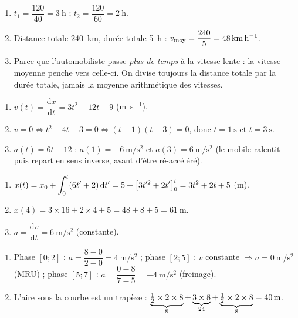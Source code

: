 \documentclass[11pt,a4paper]{article}
\begin{document}

\begin{corrige}
\begin{enumerate}[label=\alph*)]
  \item $t_1=\dfrac{120}{40}=\qty{3}{\hour}$ ; \quad $t_2=\dfrac{120}{60}=\qty{2}{\hour}$.
  \item Distance totale \qty{240}{\kilo\metre}, durée totale \qty{5}{\hour} :
        $\displaystyle v_{\text{moy}}=\frac{240}{5}=\qty{48}{\kilo\metre\per\hour}$.
  \item Parce que l'automobiliste passe \emph{plus de temps} à la vitesse lente : la vitesse
        moyenne penche vers celle-ci. On divise toujours la distance totale par la durée totale,
        jamais la moyenne arithmétique des vitesses.
\end{enumerate}
\end{corrige}

\begin{corrige}
\begin{enumerate}[label=\alph*)]
  \item $v(t)=\dfrac{\mathrm{d}x}{\mathrm{d}t}=3t^2-12t+9$ (\si{\metre\per\second}).
  \item $v=0 \Leftrightarrow t^2-4t+3=0 \Leftrightarrow (t-1)(t-3)=0$, donc $t=\qty{1}{\second}$ et $t=\qty{3}{\second}$.
  \item $a(t)=6t-12$ : $a(1)=\qty{-6}{\metre\per\second\squared}$ et $a(3)=\qty{+6}{\metre\per\second\squared}$
        (le mobile ralentit puis repart en sens inverse, avant d'être ré-accéléré).
\end{enumerate}
\end{corrige}

\begin{corrige}
\begin{enumerate}[label=\alph*)]
  \item $\displaystyle x(t)=x_0+\int_0^t(6t'+2)\,\mathrm{d}t'=5+\big[3t'^2+2t'\big]_0^t=3t^2+2t+5$ (\si{\metre}).
  \item $x(4)=3\times16+2\times4+5=48+8+5=\qty{61}{\metre}$.
  \item $a=\dfrac{\mathrm{d}v}{\mathrm{d}t}=\qty{6}{\metre\per\second\squared}$ (constante).
\end{enumerate}
\end{corrige}

\begin{corrige}
\begin{enumerate}[label=\alph*)]
  \item Phase $[0;2]$ : $a=\dfrac{8-0}{2-0}=\qty{4}{\metre\per\second\squared}$ ;
        phase $[2;5]$ : $v$ constante $\Rightarrow a=\qty{0}{\metre\per\second\squared}$ (MRU) ;
        phase $[5;7]$ : $a=\dfrac{0-8}{7-5}=\qty{-4}{\metre\per\second\squared}$ (freinage).
  \item L'aire sous la courbe est un trapèze :
        $\displaystyle \underbrace{\tfrac12\times2\times8}_{8}+\underbrace{3\times8}_{24}+\underbrace{\tfrac12\times2\times8}_{8}=\qty{40}{\metre}$.
\end{enumerate}
\end{corrige}
\end{document}
